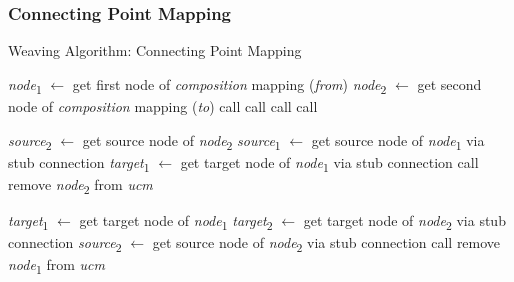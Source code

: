 \subsubsection{Connecting Point Mapping}

\begin{algorithm}
	\caption{Weaving Algorithm: Connecting Point Mapping}
	\label{alg:2}
	\begin{algorithmic}[1]
			\State \emph{node}\textsubscript{1} $\gets$ get first node of \emph{composition} mapping (\emph{from})
			\State \emph{node}\textsubscript{2} $\gets$ get second node of \emph{composition} mapping (\emph{to})
				 \label{alg:2.1}
					\State call  \label{alg:2.2}
				 \label{alg:2.3}
					\State call  \label{alg:2.4}
				\EndIf
				 \label{alg:2.5}
					\State call  \label{alg:2.6}
				 \label{alg:2.7}
					\State call  \label{alg:2.8}
				\EndIf
			\EndIf
		\EndFunction
		
		 \label{alg:2.9}
			\State \emph{source}\textsubscript{2} $\gets$ get source node of \emph{node}\textsubscript{2}
			\State \emph{source}\textsubscript{1} $\gets$ get source node of \emph{node}\textsubscript{1} via stub connection
			\State \emph{target}\textsubscript{1} $\gets$ get target node of \emph{node}\textsubscript{1} via stub connection
			\State call 
			\State remove \emph{node}\textsubscript{2} from \emph{ucm}
		\EndFunction \label{alg:2.10}
		
		 \label{alg:2.11}
			\State \emph{target}\textsubscript{1} $\gets$ get target node of \emph{node}\textsubscript{1}
			\State \emph{target}\textsubscript{2} $\gets$ get target node of \emph{node}\textsubscript{2} via stub connection
			\State \emph{source}\textsubscript{2} $\gets$ get source node of \emph{node}\textsubscript{2} via stub connection
			\State call 
			\State remove \emph{node}\textsubscript{1} from \emph{ucm}
		\EndFunction \label{alg:2.12}
		

\end{algorithmic}
\end{algorithm}
